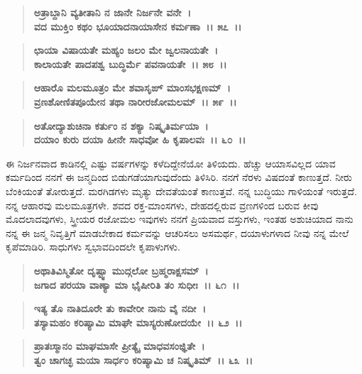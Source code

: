 \begin{verse}
\textbf{ಅತ್ರಾಬ್ದಾನಿ ವ್ಯತೀತಾನಿ ನ ಜಾನೇ ನಿರ್ಜನೇ ವನೇ~।}\\\textbf{ವದ ಮುಕ್ತಿಂ ಕಥಂ ಭೂಯಾದನಾಯಾಸೇನ ಕರ್ಮಣಾ~।। ೫೭~।।} 
\end{verse}

\begin{verse}
\textbf{ಛಾಯಾ ವಿಷಾಯತೇ ಮಹ್ಯಂ ಜಲಂ ಮೇ ಜ್ವಲನಾಯತೇ~।}\\\textbf{ಕಾಲಾಯತೇ ಪಾದಪಶ್ವ ಬುದ್ಧಿರ್ಮೆ ಪವನಾಯತೇ~।। ೫೮~।। }
\end{verse}

\begin{verse}
\textbf{ಆಹಾರೊ ಮಲಮೂತ್ರಂ ಮೇ ಶವಾಸೃಙ್ ಮಾಂಸಭಕ್ಷಣಮ್~।}\\\textbf{ವ್ರಣಶೋಣಿತಪೂಯೇನ ತಥಾ ನಾರೀರಜೋಮಲಮ್~।। ೫೯~।। }
\end{verse}

\begin{verse}
\textbf{ಅತೋದ್ಯಾಶುಚಿನಾ ಕರ್ತುಂ ನ ಶಕ್ಯಾ ನಿಷ್ಕೃತಿರ್ಮಯಾ~।}\\\textbf{ದಯಾಂ ಕುರು ದಯಾ ಹೀನೇ ಸಾಧವೋ ಹಿ ಕೃಪಾಲವಃ~।। ೬೦~।।}
\end{verse}

ಈ ನಿರ್ಜನವಾದ ಕಾಡಿನಲ್ಲಿ ಎಷ್ಟು ವರ್ಷಗಳನ್ನು ಕಳೆದಿದ್ದೇನೆಯೋ ತಿಳಿಯದು. ಹೆಚ್ಚು ಆಯಾಸವಿಲ್ಲದ ಯಾವ ಕರ್ಮದಿಂದ ನನಗೆ ಈ ಜನ್ಮದಿಂದ ಬಿಡುಗಡೆಯಾಗುವುದೆಂದು ತಿಳಿಸಿರಿ. ನನಗೆ ನೆರಳು ವಿಷದಂತೆ ಕಾಣುತ್ತದೆ. ನೀರು ಬೆಂಕಿಯಂತೆ ತೋರುತ್ತದೆ. ಮರಗಿಡಗಳು ಮೃತ್ಯು ದೇವತೆಯಂತೆ ಕಾಣುತ್ತವೆ. ನನ್ನ ಬುದ್ಧಿಯು ಗಾಳಿಯಂತೆ ಇರುತ್ತದೆ. ನನ್ನ ಆಹಾರವು ಮಲಮೂತ್ರಗಳೇ. ಶವದ ರಕ್ತ-ಮಾಂಸಗಳು, ದೇಹದಲ್ಲಿರುವ ವ್ರಣಗಳಿಂದ ಬರುವ ಕೀವು ಮೊದಲಾದವುಗಳು, ಸ್ತ್ರೀಯರ ರಜೋಮಲ ಇವುಗಳು ನನಗೆ ಪ್ರಿಯವಾದ ವಸ್ತುಗಳು, ಇಂತಹ ಅಶುಚಿಯಾದ ನಾನು ನನ್ನ ಈ ಜನ್ಮ ನಿವೃತ್ತಿಗೆ ಮಾಡಬೇಕಾದ ಕರ್ಮವನ್ನು ಆಚರಿಸಲು ಅಸಮರ್ಥ, ದಯಾಳುಗಳಾದ ನೀವು ನನ್ನ ಮೇಲೆ ಕೃಪೆಮಾಡಿರಿ. ಸಾಧುಗಳು ಸ್ವಭಾವದಿಂದಲೇ ಕೃಪಾಳುಗಳು.

\begin{verse}
\textbf{ಅಥಾತಿವಿಸ್ಮಿತೋ ದೃಷ್ಟ್ವಾ ಮುದ್ಗಲೋ ಬ್ರಹ್ಮರಾಕ್ಷಸಮ್~।}\\\textbf{ಜಗಾದ ಪರಯಾ ವಾಣ್ಯಾ ಮಾ ಭೈಷೀರಿತಿ ತಂ ಸುಧೀಃ~।। ೬೧~।।} 
\end{verse}

\begin{verse}
\textbf{ಇತ್ಯ ತೊ ನಾತಿದೂರೇ ತು ಕಾವೇರೀ ನಾನು ವೈ ನದೀ~।}\\\textbf{ತಸ್ಯಾಮಹಂ ಕರಿಷ್ಯಾಮಿ ಮಾಘೇ ಮಾಸ್ಯರುಣೋದಯೇ~।। ೬೨~।। }
\end{verse}

\begin{verse}
\textbf{ಪ್ರಾತಃಸ್ಮಾನಂ ಮಾಘಮಾಸೇ ಪ್ರೀತ್ಯೈ ಮಾಧವಸಂಜ್ಞಿತೇ~।}\\\textbf{ತ್ವಂ ಚಾಗಚ್ಛ ಮಯಾ ಸಾರ್ಧಂ ಕರಿಷ್ಯಾಮಿ ಚ ನಿಷ್ಕೃತಿಮ್~।। ೬೩~।।}
\end{verse}

